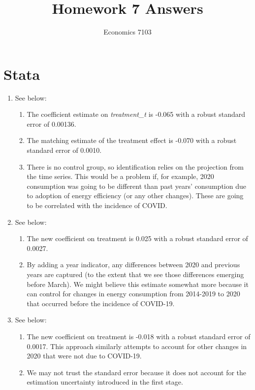 \documentclass{article}
\title{Homework 7 Answers}
\author{Economics 7103}
\date{ }
\begin{document}
  
\maketitle

\section{Stata}

\begin{enumerate}
    \item See below:
    \begin{enumerate}
        \item The coefficient estimate on \textit{treatment_t} is -0.065 with a robust standard error of 0.00136.
        \item The matching estimate of the treatment effect is -0.070 with a robust standard error of 0.0010.
        \item There is no control group, so identification relies on the projection from the time series.  This would be a problem if, for example, 2020 consumption was going to be different than past years' consumption due to adoption of energy efficiency (or any other changes).  These are going to be correlated with the incidence of COVID.
    \end{enumerate}
    \item See below:
    \begin{enumerate}
        \item The new coefficient on treatment is 0.025 with a robust standard error of 0.0027.
        \item By adding a year indicator, any differences between 2020 and previous years are captured (to the extent that we see those differences emerging before March).  We might believe this estimate somewhat more because it can control for changes in energy consumption from 2014-2019 to 2020 that occurred before the incidence of COVID-19.
    \end{enumerate}
    \item See below:
    \begin{enumerate}
        \item The new coefficient on treatment is -0.018 with a robust standard error of 0.0017.  This approach similarly attempts to account for other changes in 2020 that were not due to COVID-19.
        \item We may not trust the standard error because it does not account for the estimation uncertainty introduced in the first stage.
    \end{enumerate}
\end{enumerate}
\end{document}
